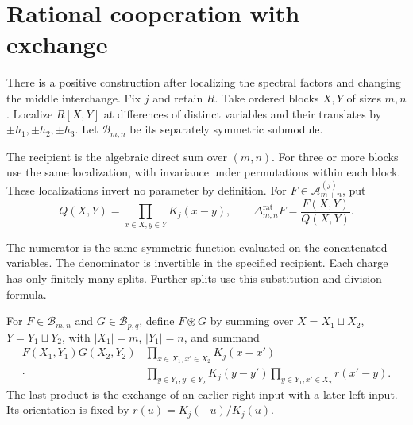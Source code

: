 \section{Rational cooperation with exchange}
There is a positive construction after localizing the spectral
factors and changing the middle interchange.  Fix $j$ and retain
$R$.  Take ordered blocks $X,Y$ of sizes $m,n$.
Localize $R[X,Y]$ at differences of distinct variables and their
translates by $\pm h_1,\pm h_2,\pm h_3$.
Let $\mathcal B_{m,n}$ be its separately symmetric submodule.

The recipient is the algebraic direct sum over $(m,n)$.
For three or more blocks use the same localization, with invariance
under permutations within each block.  These localizations invert
no parameter by definition.  For
$F\in\mathcal A^{(j)}_{m+n}$, put
\[
 Q(X,Y)=\prod_{x\in X,y\in Y}K_j(x-y),
 \qquad
 \Delta^{\mathrm{rat}}_{m,n}F=\frac{F(X,Y)}{Q(X,Y)}.
\]

The numerator is the same symmetric function evaluated on the
concatenated variables.  The denominator is invertible in the
specified recipient.  Each charge has only finitely many splits.
Further splits use this substitution and division formula.

For $F\in\mathcal B_{m,n}$ and $G\in\mathcal B_{p,q}$, define
$F\circledast G$ by summing over $X=X_1\sqcup X_2$,
$Y=Y_1\sqcup Y_2$, with $|X_1|=m$, $|Y_1|=n$, and summand
\begin{equation}\label{cbc:l027:recipient-product}
 \begin{split}
 F(X_1,Y_1)G(X_2,Y_2)&
 \prod_{x\in X_1,x'\in X_2}K_j(x-x')\\
 {}\cdot&\prod_{y\in Y_1,y'\in Y_2}K_j(y-y')
 \prod_{y\in Y_1,x'\in X_2}r(x'-y).
 \end{split}
\end{equation}
The last product is the exchange of an earlier right input with
a later left input.  Its orientation is fixed by
$r(u)=K_j(-u)/K_j(u)$.

